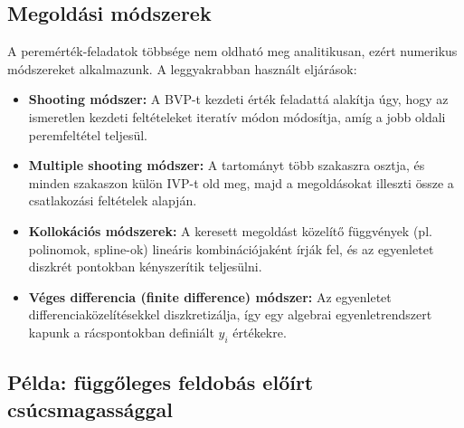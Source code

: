 \subsection{Megoldási módszerek}

A peremérték-feladatok többsége nem oldható meg analitikusan, ezért numerikus módszereket alkalmazunk. A leggyakrabban használt eljárások:

\begin{itemize}
  \item \textbf{Shooting módszer:}
  A BVP-t kezdeti érték feladattá alakítja úgy, hogy az ismeretlen kezdeti feltételeket iteratív módon módosítja, amíg a jobb oldali peremfeltétel teljesül.

  \item \textbf{Multiple shooting módszer:}
  A tartományt több szakaszra osztja, és minden szakaszon külön IVP-t old meg, majd a megoldásokat illeszti össze a csatlakozási feltételek alapján.

  \item \textbf{Kollokációs módszerek:}
  A keresett megoldást közelítő függvények (pl. polinomok, spline-ok) lineáris kombinációjaként írják fel, és az egyenletet diszkrét pontokban kényszerítik teljesülni.

  \item \textbf{Véges differencia (finite difference) módszer:}
  Az egyenletet differenciaközelítésekkel diszkretizálja, így egy algebrai egyenletrendszert kapunk a rácspontokban definiált $y_i$ értékekre.
\end{itemize}

\subsection{Példa: függőleges feldobás előírt csúcsmagassággal}
\examplebody

